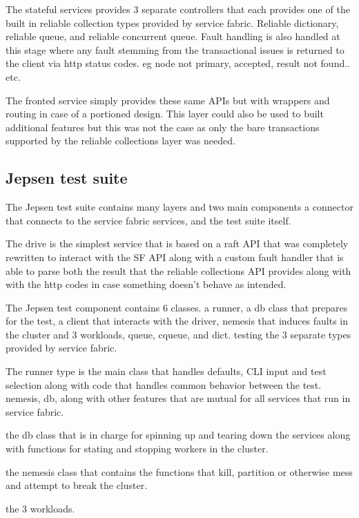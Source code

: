 \documentclass[a4paper,10pt,titlepage]{report}
\begin{document}
    The stateful services provides 3 separate controllers that each provides one of the built in reliable collection types provided by service fabric. Reliable dictionary, reliable queue, and reliable concurrent queue. Fault handling is also handled at this stage where any fault stemming from the transactional issues is returned to the client via http status codes\cite{wikihttpstatuscodes}. eg node not primary, accepted, result not found.. etc.

    The fronted service simply provides these same APIs but with wrappers and routing in case of a portioned design. This layer could also be used to built additional features but this was not the case as only the bare transactions supported by the reliable collections layer was needed.

    \subsection{Jepsen test suite}
    The Jepsen test suite contains many layers and two main components a connector that connects to the service fabric services, and the test suite itself.

    The drive is the simplest service that is based on a raft API that was completely rewritten to interact with the SF API along with a custom fault handler that is able to parse both the result that the reliable collections API provides along with with the http codes in case something doesn't behave as intended.

    The Jepsen test component contains 6 classes. a runner, a db class that prepares for the test, a client that interacts with the driver, nemesis that induces faults in the cluster and 3 workloads, queue, cqueue, and dict. testing the 3 separate types provided by service fabric.

    The runner type is the main class that handles defaults, CLI input and test selection along with code that handles common behavior between the test. nemesis, db, along with other features that are mutual for all services that run in service fabric.

    the db class that is in charge for spinning up and tearing down the services along with functions for stating and stopping workers in the cluster.

    the nemesis class that contains the functions that kill, partition or otherwise mess and attempt to break the cluster.

    the 3 workloads.
\end{document}
